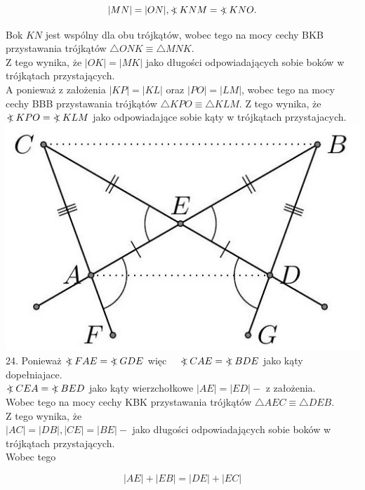 \documentclass[10pt]{article}
\newcommand\Varangle{\mathop{{<\!\!\!\!\!\text{\small)}}\:}\nolimits}
\begin{document}
\[
|M N|=|O N|, \Varangle K N M=\Varangle K N O .
\]

Bok \(K N\) jest wspólny dla obu trójkątów, wobec tego na mocy cechy BKB przystawania trójkątów \(\triangle O N K \equiv \triangle M N K\).\\
Z tego wynika, że \(|O K|=|M K|\) jako długości odpowiadających sobie boków w trójkątach przystających.\\
A ponieważ z założenia \(|K P|=|K L|\) oraz \(|P O|=|L M|\), wobec tego na mocy cechy BBB przystawania trójkątów \(\triangle K P O \equiv \triangle K L M\). Z tego wynika, że \(\Varangle K P O=\Varangle K L M\) jako odpowiadające sobie kąty w trójkątach przystajacych.\\
\includegraphics[max width=\textwidth, center]{2024_11_21_71f62bd117d375398909g-066}\\
24. Ponieważ \(\Varangle F A E=\Varangle G D E\) więc \(\quad \Varangle C A E=\Varangle B D E\) jako kąty dopełniajace.\\
\(\Varangle C E A=\Varangle B E D\) jako kąty wierzchołkowe \(|A E|=|E D|-\) z założenia.\\
Wobec tego na mocy cechy KBK przystawania trójkątów \(\triangle A E C \equiv \triangle D E B\).\\
Z tego wynika, że\\
\(|A C|=|D B|,|C E|=|B E|-\) jako długości odpowiadających sobie boków w trójkątach przystających.\\
Wobec tego

\[
|A E|+|E B|=|D E|+|E C|
\]
\end{document}
